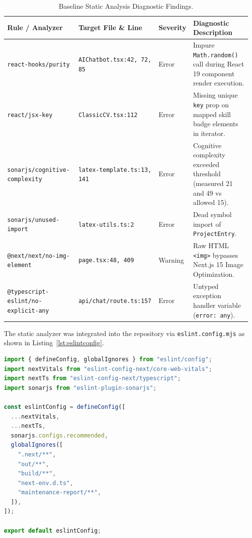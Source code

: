 \documentclass[12pt,a4paper]{article}
\begin{document}
\begin{table}[H]
\centering
\small
\begin{tabularx}{\textwidth}{l p{4.2cm} l X}
\toprule
\textbf{Rule / Analyzer} & \textbf{Target File \& Line} & \textbf{Severity} & \textbf{Diagnostic Description} \\
\midrule
\texttt{react-hooks/purity} & \texttt{AIChatbot.tsx:42, 72, 85} & Error & Impure \texttt{Math.random()} call during React 19 component render execution. \\
\texttt{react/jsx-key} & \texttt{ClassicCV.tsx:112} & Error & Missing unique \texttt{key} prop on mapped skill badge elements in iterator. \\
\texttt{sonarjs/cognitive-complexity} & \texttt{latex-template.ts:13, 141} & Error & Cognitive complexity exceeded threshold (measured 21 and 49 vs allowed 15). \\
\texttt{sonarjs/unused-import} & \texttt{latex-utils.ts:2} & Error & Dead symbol import of \texttt{ProjectEntry}. \\
\texttt{@next/next/no-img-element} & \texttt{page.tsx:48, 409} & Warning & Raw HTML \texttt{<img>} bypasses Next.js 15 Image Optimization. \\
\texttt{@typescript-eslint/no-explicit-any} & \texttt{api/chat/route.ts:157} & Error & Untyped exception handler variable (\texttt{error: any}). \\
\bottomrule
\end{tabularx}
\caption{Baseline Static Analysis Diagnostic Findings.}
\label{tab:baseline_static}
\end{table}

The static analyzer was integrated into the repository via \texttt{eslint.config.mjs} as shown in Listing~\ref{lst:eslintconfig}.

\begin{lstlisting}[language=TypeScript, caption={ESLint \& SonarJS Configuration (\texttt{eslint.config.mjs})}, label={lst:eslintconfig}]
import { defineConfig, globalIgnores } from "eslint/config";
import nextVitals from "eslint-config-next/core-web-vitals";
import nextTs from "eslint-config-next/typescript";
import sonarjs from "eslint-plugin-sonarjs";

const eslintConfig = defineConfig([
  ...nextVitals,
  ...nextTs,
  sonarjs.configs.recommended,
  globalIgnores([
    ".next/**",
    "out/**",
    "build/**",
    "next-env.d.ts",
    "maintenance-report/**",
  ]),
]);

export default eslintConfig;
\end{lstlisting}
\end{document}
